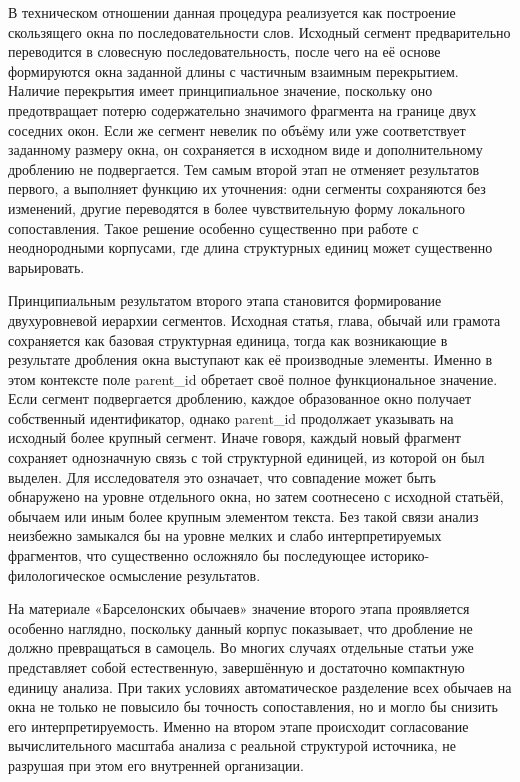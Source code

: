 В техническом отношении данная процедура реализуется как построение скользящего окна по последовательности слов. Исходный сегмент предварительно переводится в словесную последовательность, после чего на её основе формируются окна заданной длины с частичным взаимным перекрытием. Наличие перекрытия имеет принципиальное значение, поскольку оно предотвращает потерю содержательно значимого фрагмента на границе двух соседних окон. Если же сегмент невелик по объёму или уже соответствует заданному размеру окна, он сохраняется в исходном виде и дополнительному дроблению не подвергается. Тем самым второй этап не отменяет результатов первого, а выполняет функцию их уточнения: одни сегменты сохраняются без изменений, другие переводятся в более чувствительную форму локального сопоставления. Такое решение особенно существенно при работе с неоднородными корпусами, где длина структурных единиц может существенно варьировать.

Принципиальным результатом второго этапа становится формирование двухуровневой иерархии сегментов. Исходная статья, глава, обычай или грамота сохраняется как базовая структурная единица, тогда как возникающие в результате дробления окна выступают как её производные элементы. Именно в этом контексте поле parent\_id обретает своё полное функциональное значение. Если сегмент подвергается дроблению, каждое образованное окно получает собственный идентификатор, однако parent\_id продолжает указывать на исходный более крупный сегмент. Иначе говоря, каждый новый фрагмент сохраняет однозначную связь с той структурной единицей, из которой он был выделен. Для исследователя это означает, что совпадение может быть обнаружено на уровне отдельного окна, но затем соотнесено с исходной статьёй, обычаем или иным более крупным элементом текста. Без такой связи анализ неизбежно замыкался бы на уровне мелких и слабо интерпретируемых фрагментов, что существенно осложняло бы последующее историко-филологическое осмысление результатов.

На материале «Барселонских обычаев» значение второго этапа проявляется особенно наглядно, поскольку данный корпус показывает, что дробление не должно превращаться в самоцель. Во многих случаях отдельные статьи уже представляет собой естественную, завершённую и достаточно компактную единицу анализа. При таких условиях автоматическое разделение всех обычаев на окна не только не повысило бы точность сопоставления, но и могло бы снизить его интерпретируемость. Именно на втором этапе происходит согласование вычислительного масштаба анализа с реальной структурой источника, не разрушая при этом его внутренней организации.


